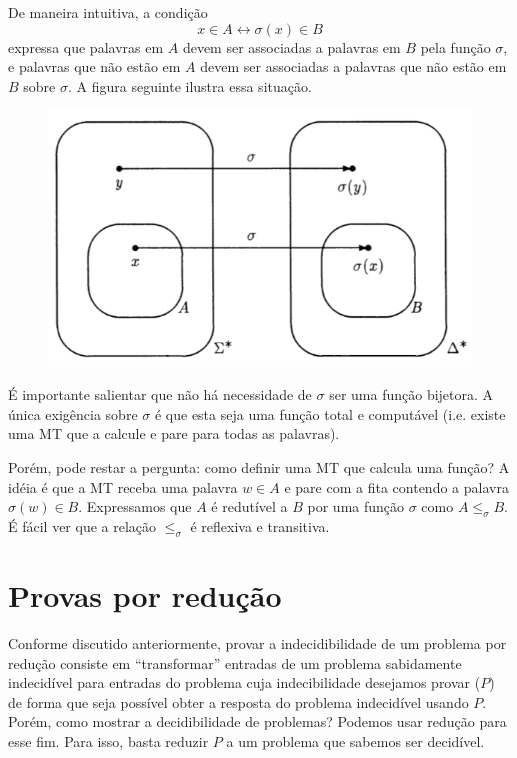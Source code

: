 \documentclass[a4paper]{article}
\theoremstyle{definition}
\begin{document}
  De maneira intuitiva, a condição
  \[
    x \in A \leftrightarrow\sigma(x) \in B 
  \]
  expressa que palavras em $A$ devem ser associadas a palavras em $B$ pela
  função $\sigma$, e palavras que não estão em $A$ devem ser associadas a
  palavras que não estão em $B$ sobre $\sigma$. A figura seguinte ilustra essa
  situação.
  \begin{figure}[H]
    \includegraphics[scale=.4]{reduction.png}
    \centering
  \end{figure}
  É importante salientar que não há necessidade de $\sigma$ ser uma função
  bijetora. A única exigência sobre $\sigma$ é que esta seja uma função total e
  computável (i.e. existe uma MT que a calcule e pare para todas as palavras).

  Porém, pode restar a pergunta: como definir uma MT que calcula uma função?
  A idéia é que a MT receba uma palavra $w \in A$ e pare com a fita contendo
  a palavra $\sigma(w) \in B$. Expressamos que $A$ é redutível a $B$ por uma
  função $\sigma$ como $A\leq_\sigma B$. É fácil ver que a relação $\leq_\sigma$
  é reflexiva e transitiva.

  \section{Provas por redução}
  
  Conforme discutido anteriormente, provar a indecidibilidade de um problema
  por redução consiste em ``transformar'' entradas de um problema sabidamente
  indecidível para entradas do problema cuja indecibilidade desejamos provar ($P$) de
  forma que seja possível obter a resposta do problema indecidível usando $P$.
  Porém, como mostrar a decidibilidade de problemas? Podemos usar redução para
  esse fim. Para isso, basta reduzir $P$ a um problema que sabemos ser
  decidível.
\end{document}
